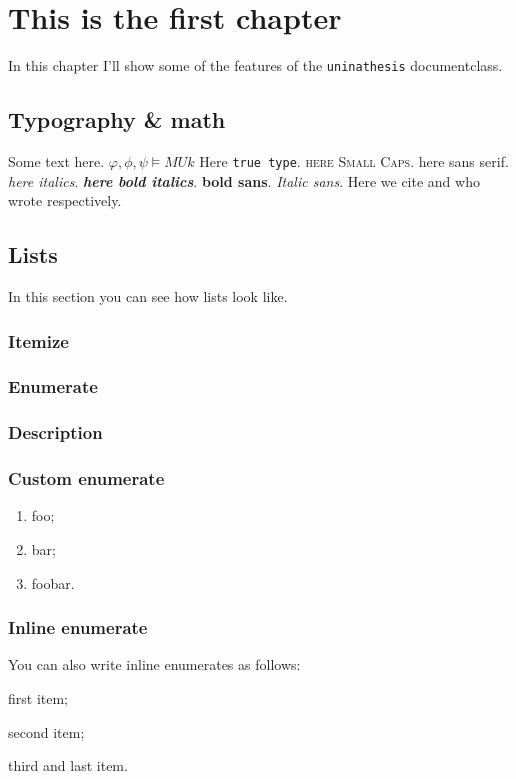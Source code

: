 \chapter{This is the first chapter}\label{chap:first}

\inlineminitoc

\noindent In this chapter I'll show some of the features of the \texttt{uninathesis} documentclass.

\section{Typography \& math}
Some text here. \(\varphi,\phi,\psi\vDash M U k\)
Here \texttt{true type}. 
\textsc{here Small Caps}. 
\textsf{here sans serif}. 
\emph{here italics}.
\textbf{\emph{here bold italics}}.
\textbf{\textsf{bold sans}}.
\textsf{\emph{Italic sans}}.
Here we cite \citeauthor{dijkstra1972humbleprogrammer} and \citeauthor{lamport1982proving}
who wrote \cite{dijkstra1972humbleprogrammer,lamport1982proving} respectively.
\blindmathpaper

\section{Lists}
In this section you can see how lists look like.
\subsection{Itemize}
\blinditemize
\subsection{Enumerate}
\blindenumerate
\subsection{Description}
\blinddescription
\subsection{Custom enumerate}
\begin{enumerate}[label=(\roman*)]
    \item foo;
    \item bar;
    \item foobar.
\end{enumerate}
\subsection{Inline enumerate}
You can also write inline enumerates as follows:
\begin{enumerate*}[label=(\roman*)]
    \item first item;
    \item second item;
    \item third and last item.
\end{enumerate*}

